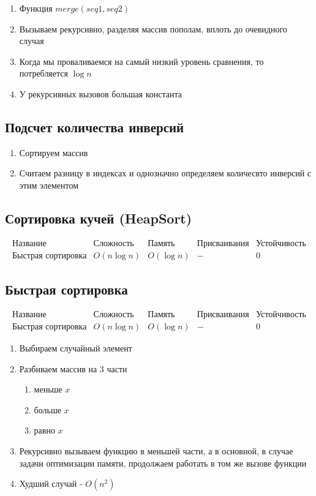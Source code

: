 \begin{enumerate}
    \item Функция $merge(seq1, seq2)$
    \item Вызываем рекурсивно, разделяя массив пополам, вплоть до очевидного случая
    \item Когда мы проваливаемся на самый низкий уровень сравнения, то потребляется $\log n$
    \item У рекурсивных вызовов большая константа
\end{enumerate}

\subsection{Подсчет количества инверсий}

\begin{enumerate}
    \item Сортируем массив
    \item Считаем разницу в индексах и однозначно определяем количесвто инверсий с этим элементом
\end{enumerate}


\subsection{Сортировка кучей (HeapSort)}

$$\begin{array}{c|c|c|c|c}
    \text{Название} & \text{Сложность} & \text{Память} & \text{Присваивания} & \text{Устойчивость} \\
    \hline
    \text{Быстрая сортировка} & O(n \log n) & O(\log n) & - & 0
\end{array}$$


\subsection{Быстрая сортировка}

$$\begin{array}{c|c|c|c|c}
    \text{Название} & \text{Сложность} & \text{Память} & \text{Присваивания} & \text{Устойчивость} \\
    \hline
    \text{Быстрая сортировка} & O(n \log n) & O(\log n) & - & 0
\end{array}$$

\begin{enumerate}
    \item Выбираем случайный элемент
    \item Разбиваем массив на 3 части \begin{enumerate}
        \item меньше $x$
        \item больше $x$
        \item равно $x$
    \end{enumerate}
    \item Рекурсивно вызываем функцию в меньшей части, а в основной, в случае задачи оптимизации памяти, продолжаем работать в том же вызове функции
    \item Худший случай - $O(n^2)$
\end{enumerate}

